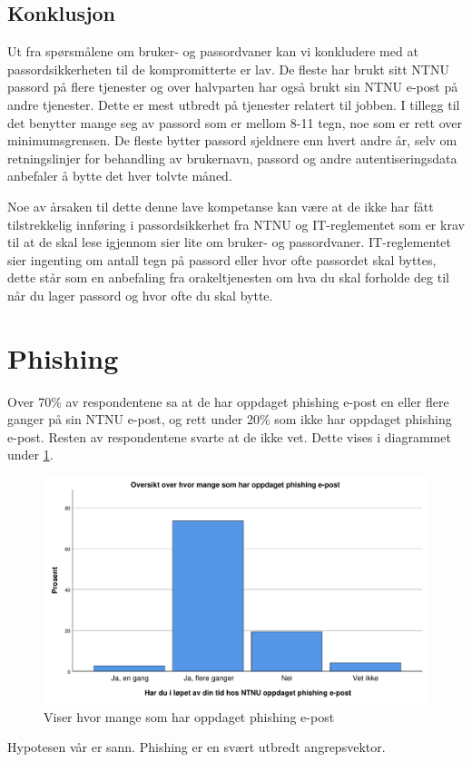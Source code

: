\subsection{Konklusjon}
Ut fra spørsmålene om bruker- og passordvaner kan vi konkludere med at passordsikkerheten til de kompromitterte er lav. De fleste har brukt sitt NTNU passord på flere tjenester og over halvparten har også brukt sin NTNU e-post på andre tjenester. Dette er mest utbredt på tjenester relatert til jobben. I tillegg til det benytter mange seg av passord som er mellom 8-11 tegn, noe som er rett over minimumsgrensen. De fleste bytter passord sjeldnere enn hvert andre år, selv om retningslinjer for behandling av brukernavn, passord og andre autentiseringsdata \cite{RetnBPA} anbefaler å bytte det hver tolvte måned. 

Noe av årsaken til dette denne lave kompetanse kan være at de ikke har fått tilstrekkelig innføring i passordsikkerhet fra NTNU og IT-reglementet som er krav til at de skal lese igjennom sier lite om bruker- og passordvaner. IT-reglementet sier ingenting om antall tegn på passord eller hvor ofte passordet skal byttes, dette står som en anbefaling fra orakeltjenesten om hva du skal forholde deg til når du lager passord og hvor ofte du skal bytte.   

\section{Phishing}
Over 70\% av respondentene sa at de har oppdaget phishing e-post en eller flere ganger på sin NTNU e-post, og rett under 20\% som ikke har oppdaget phishing e-post. Resten av respondentene svarte at de ikke vet. Dette vises i diagrammet under \ref{fig:oppdaget-phishing}.
\begin{figure}[H]
    \centering
    \includegraphics[scale=0.5]{case_2/bilder/spss/oppdaget_phish.pdf}
    \caption[oppdaget-phishing]{Viser hvor mange som har oppdaget phishing e-post}
    \label{fig:oppdaget-phishing}
\end{figure}
Hypotesen vår er sann. Phishing er en svært utbredt angrepsvektor. 

